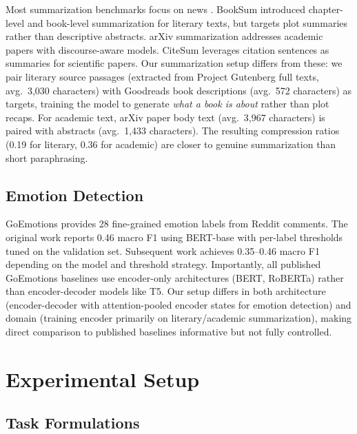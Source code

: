 \documentclass[11pt]{article}
\begin{document}
Most summarization benchmarks focus on news \citep{nallapati2016abstractive, narayan2018don}. BookSum \citep{kryscinski2021booksum} introduced chapter-level and book-level summarization for literary texts, but targets plot summaries rather than descriptive abstracts. arXiv summarization \citep{cohan2018discourse} addresses academic papers with discourse-aware models. CiteSum \citep{mao2022citesum} leverages citation sentences as summaries for scientific papers. Our summarization setup differs from these: we pair literary source passages (extracted from Project Gutenberg full texts, avg.\ 3,030 characters) with Goodreads book descriptions (avg.\ 572 characters) as targets, training the model to generate \textit{what a book is about} rather than plot recaps. For academic text, arXiv paper body text (avg.\ 3,967 characters) is paired with abstracts (avg.\ 1,433 characters). The resulting compression ratios (0.19 for literary, 0.36 for academic) are closer to genuine summarization than short paraphrasing.

\subsection{Emotion Detection}

GoEmotions \citep{demszky2020goemotions} provides 28 fine-grained emotion labels from Reddit comments. The original work reports 0.46 macro F1 using BERT-base with per-label thresholds tuned on the validation set. Subsequent work achieves 0.35--0.46 macro F1 depending on the model and threshold strategy. Importantly, all published GoEmotions baselines use encoder-only architectures (BERT, RoBERTa) rather than encoder-decoder models like T5. Our setup differs in both architecture (encoder-decoder with attention-pooled encoder states for emotion detection) and domain (training encoder primarily on literary/academic summarization), making direct comparison to published baselines informative but not fully controlled.

\section{Experimental Setup}

\subsection{Task Formulations}
\label{sec:task_formulation}
\end{document}
